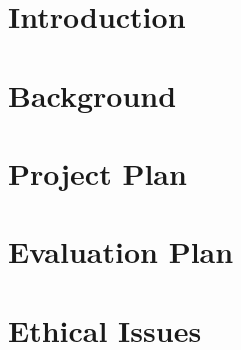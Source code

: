 \documentclass[12pt,twoside]{report}
\begin{document}



\clearpage{\pagestyle{empty}\cleardoublepage}
\setcounter{page}{1}
\pagestyle{fancy}




\tableofcontents


\clearpage{\pagestyle{empty}\cleardoublepage}
\setcounter{page}{1}
\fancyhead[LE,RO]{\slshape \rightmark}
\fancyhead[LO,RE]{\slshape \leftmark}

\chapter{Introduction}


\chapter{Background}



\chapter{Project Plan}


\chapter{Evaluation Plan}


\chapter{Ethical Issues}

\printbibliography
\end{document}
